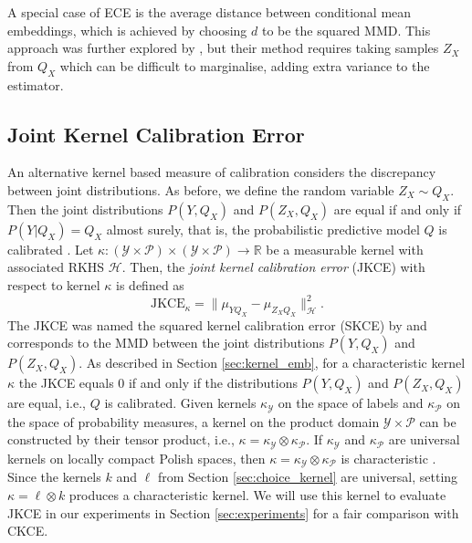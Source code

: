 \documentclass[twocolumn]{article}
\theoremstyle{definition}
\begin{document}
A special case of ECE is the average distance between conditional mean embeddings, which is achieved by choosing $d$ to be the squared MMD. This approach was further explored by \citet{Chatterjee_2024}, but their method requires taking samples $Z_X$ from $Q_X$ which can be difficult to marginalise, adding extra variance to the estimator.


\subsection{Joint Kernel Calibration Error}

An alternative kernel based measure of calibration considers the discrepancy between joint distributions. As before, we define the random variable $Z_X \sim Q_X$. Then the joint distributions $P(Y, Q_X)$ and $P(Z_X, Q_X)$ are equal if and only if $P(Y | Q_X) = Q_X$ almost surely, that is, the probabilistic predictive model $Q$ is calibrated \citep{Widmann_2021}. Let $\kappa: (\mathcal{Y} \times \mathcal{P}) \times (\mathcal{Y} \times \mathcal{P}) \to \mathbb{R}$ be a measurable kernel with associated RKHS $\mathcal{H}$. Then, the \emph{joint kernel calibration error} (JKCE) with respect to kernel $\kappa$ is defined as
\begin{equation} \label{eq:jkce}
    \text{JKCE}_\kappa = \| \mu_{Y Q_X} - \mu_{Z_X Q_X} \|_{\mathcal{H}}^2.
\end{equation}
The JKCE was named the squared kernel calibration error (SKCE) by \citet{Widmann_2021} and corresponds to the MMD between the joint distributions $P(Y, Q_X)$ and $P(Z_X, Q_X)$. As described in Section \ref{sec:kernel_emb}, for a characteristic kernel $\kappa$ the JKCE equals 0 if and only if the distributions $P(Y, Q_X)$ and $P(Z_X, Q_X)$ are equal, i.e., $Q$ is calibrated. Given kernels $\kappa_{\mathcal{Y}}$ on the space of labels and $\kappa_{\mathcal{P}}$ on the space of probability measures, a kernel on the product domain $\mathcal{Y} \times \mathcal{P}$ can be constructed by their tensor product, i.e., $\kappa = \kappa_{\mathcal{Y}} \otimes \kappa_{\mathcal{P}}$. If $\kappa_{\mathcal{Y}}$ and $\kappa_{\mathcal{P}}$ are universal kernels on locally compact Polish spaces, then $\kappa = \kappa_{\mathcal{Y}} \otimes \kappa_{\mathcal{P}}$ is characteristic \citep[Theorem 5]{Szabo_2018}. Since the kernels $k$ and $\ell$ from Section \ref{sec:choice_kernel} are universal, setting $\kappa = \ell \otimes k$ produces a characteristic kernel. We will use this kernel to evaluate JKCE in our experiments in Section \ref{sec:experiments} for a fair comparison with CKCE. 
\end{document}
